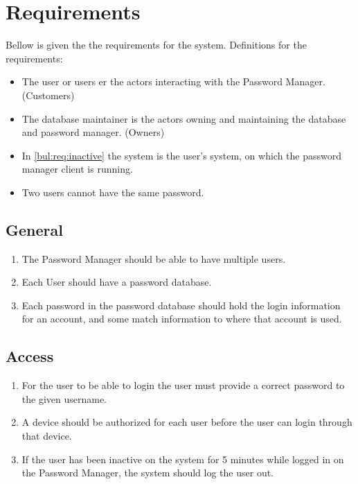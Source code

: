 \chapter{Requirements}
Bellow is given the the requirements for the system. Definitions for the requirements:
\begin{itemize}
    \item The user or users er the actors interacting with the Password Manager. (Customers)
    \item The database maintainer is the actors owning and maintaining the database and password manager. (Owners)
    \item In \ref{bul:req:inactive} the system is the user's system, on which the password manager client is running.
    \item Two users cannot have the same password.
\end{itemize}

\section{General}
\begin{enumerate}[label={\textbf{Req. \arabic*}}, ref={req. \arabic*}]
    \item The Password Manager should be able to have multiple users.
    \item Each User should have a password database.
    \item Each password in the password database should hold the login information for an account, and some match information to where that account is used.

\end{enumerate}
\section{Access}
\begin{enumerate}[resume*]

    \item For the user to be able to login the user must provide a correct password to the given username.
    \item A device should be authorized for each user before the user can login through that device.
    \item If the user has been inactive on the system for 5 minutes while logged in on the Password Manager, the system should log the user out. \label{bul:req:inactive}

\end{enumerate}
